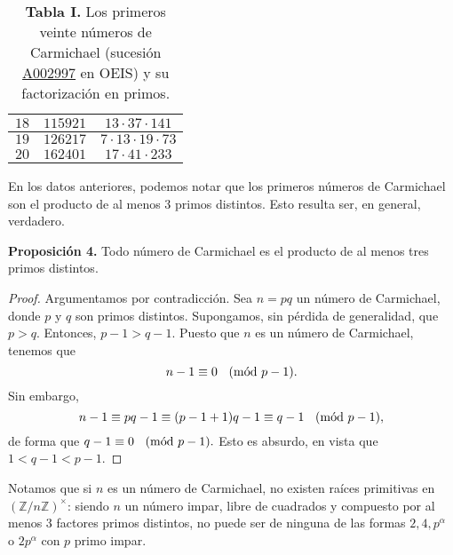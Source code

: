\documentclass{article}
\theoremstyle{definition}
\newcommand{\Mod}[1]{\ \hspace{0.2cm} (\mathrm{m\acute{o}d}\ #1)}
\begin{document}
\begin{table}[h]
\begin{tabulary}{0.9\textwidth}{| C| C|C|}
	$18$ & $115921$  & $13 \cdot 37 \cdot 141$   \\  \hline
	
	$19$ & $126217$  & $7 \cdot 13 \cdot 19 \cdot 73$   \\  \hline
	
	$20$ & $162401$  & $17 \cdot 41 \cdot 233$   \\  \hline

	\end{tabulary}
\caption*{\textbf{Tabla I. } Los primeros veinte números de Carmichael (sucesión \href{https://oeis.org/A002997}{A002997} en OEIS) y su factorización en primos.  }
\end{table}	

	En los datos anteriores, podemos notar que los primeros números de Carmichael son el producto de al menos $3$ primos distintos. Esto resulta ser, en general, verdadero. 
	
\begin{mybox2}
\textbf{Proposición 4.} Todo número de Carmichael es el producto de al menos tres primos distintos. 
\end{mybox2}		 
\begin{proof}
Argumentamos por contradicción. Sea $n = pq$ un número de Carmichael, donde $p$ y $q$ son primos distintos. Supongamos, sin pérdida de generalidad, que $p > q$. Entonces, $ p -1 > q - 1$. Puesto que $n$ es un número de Carmichael, tenemos que
$$ n - 1 \equiv 0 \Mod{p-1} .$$	
Sin embargo,
$$ n -1 \equiv pq - 1 \equiv (p - 1 + 1)q - 1 \equiv q - 1 \Mod{p-1},  $$
de forma que $q - 1 \equiv 0 \Mod{p-1}.$ Esto es absurdo, en vista que \newline $1 < q-1 < p - 1$.
\end{proof}
\vspace{0.5cm}
Notamos  que si $n$ es un número de Carmichael, no existen raíces primitivas en $(\mathbb{Z} / n \mathbb{Z})^{\times}$: siendo $n$ un número impar, libre de cuadrados y compuesto por al menos $3$ factores primos distintos, no puede ser de ninguna de las formas $2, 4, p^{\alpha}$ o $2 p^{\alpha}$ con $p$ primo impar. 

\newpage
\end{document}
